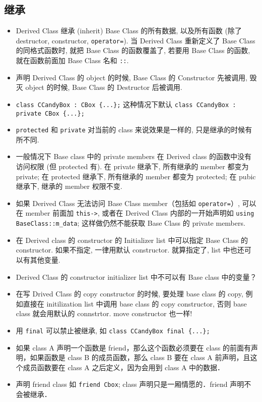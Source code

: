 \subsection{继承}
\begin{itemize}

\item Derived Class 继承 (inherit) Base Class 的所有数据, 以及所有函数 (除了 destructor, constructor, \verb|operator=|). 当 Derived Class 重新定义了 Base Class 的同格式函数时, 就把 Base Class 的函数覆盖了, 若要用 Base Class 的函数, 就在函数前面加 Base Class 名和 \verb|::|.
\item 声明 Derived Class 的 object 的时候, Base Class 的 Constructor 先被调用, 毁灭 object 的时候, Base Class 的 Destructor 后被调用.
\item \verb|class CCandyBox : CBox {...};| 这种情况下默认 \verb|class CCandyBox : private CBox {...};|
\item \verb|protected| 和 \verb|private| 对当前的 class 来说效果是一样的, 只是继承的时候有所不同.
\item 一般情况下 Base class 中的 private members 在 Derived class 的函数中没有访问权限 (但 protected 有). 在 private 继承下, 所有继承的 member 都变为 private; 在 protected 继承下, 所有继承的 member 都变为 protected; 在 pubic 继承下, 继承的 member 权限不变.
\item 如果 Derived Class 无法访问 Base Class member（包括如 \verb|operator=|）, 可以在 member 前面加 \verb|this->|, 或者在 Derived Class 内部的一开始声明如 \verb|using BaseClass::m_data|; 这样做仍然不能获取 Base Class 的 private members.
\item 在 Derived class 的 constructor 的 Initializer list 中可以指定 Base Class 的 constructor. 如果不指定, 一律用默认 constructor. 就算指定了, list 中也还可以有其他变量.
\item Derived Class 的 constructor initializer list 中不可以有 Base class 中的变量？
\item 在写 Drived Class 的 copy constructor 的时候, 要处理 base class 的 copy, 例如直接在 initilization list 中调用 base class 的 copy constructor, 否则 base class 就会用默认的 connstrtor. move constructor 也一样!
\item 用 \verb|final| 可以禁止被继承, 如 \verb|class CCandyBox final {...};|
\item 如果 class A 声明一个函数是 friend，那么这个函数必须要在 class 的前面有声明，如果函数是 class B 的成员函数，那么 class B 要在 class A 前声明，且这个成员函数要在 class A 之后定义，因为会用到 class A 中的数据．
\item 声明 friend class 如 \verb|friend Cbox|; class 声明只是一厢情愿的．friend 声明不会被继承．
\end{itemize}

